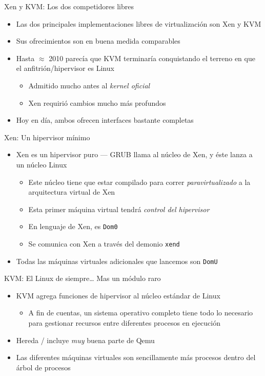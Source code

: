 \documentclass[presentation]{beamer}
\begin{document}
\begin{frame}[label={sec:org58bba09}]{Xen y KVM: Los dos competidores libres}
\begin{itemize}
\item Las dos principales implementaciones libres de virtualización son
Xen y KVM
\item Sus ofrecimientos son en buena medida comparables
\item Hasta \(\approx\) 2010 parecía que KVM terminaría conquistando el
terreno en que el anfitrión/hipervisor es Linux
\begin{itemize}
\item Admitido mucho antes al \emph{kernel oficial}
\item Xen requirió cambios mucho más profundos
\end{itemize}
\item Hoy en día, ambos ofrecen interfaces bastante completas
\end{itemize}
\end{frame}

\begin{frame}[label={sec:orgfe5d383},fragile]{Xen: Un hipervisor mínimo}
 \begin{itemize}
\item Xen es un hipervisor puro — GRUB llama al núcleo de Xen, y éste
lanza a un núcleo Linux
\begin{itemize}
\item Este núcleo tiene que estar compilado para correr
\emph{paravirtualizado} a la arquitectura virtual de Xen
\item Esta primer máquina virtual tendrá \emph{control del hipervisor}
\item En lenguaje de Xen, es \texttt{Dom0}
\item Se comunica con Xen a través del demonio \texttt{xend}
\end{itemize}
\item Todas las máquinas virtuales adicionales que lancemos son \texttt{DomU}
\end{itemize}
\end{frame}

\begin{frame}[label={sec:org3ca72f7}]{KVM: El Linux de siempre\ldots{} Mas un módulo raro}
\begin{itemize}
\item KVM agrega funciones de hipervisor al núcleo estándar de Linux
\begin{itemize}
\item A fin de cuentas, un sistema operativo completo tiene todo lo
necesario para gestionar recursos entre diferentes procesos en
ejecución
\end{itemize}
\item Hereda / incluye \emph{muy} buena parte de Qemu
\item Las diferentes máquinas virtuales son sencillamente más procesos
dentro del árbol de procesos
\end{itemize}
\end{frame}
\end{document}
